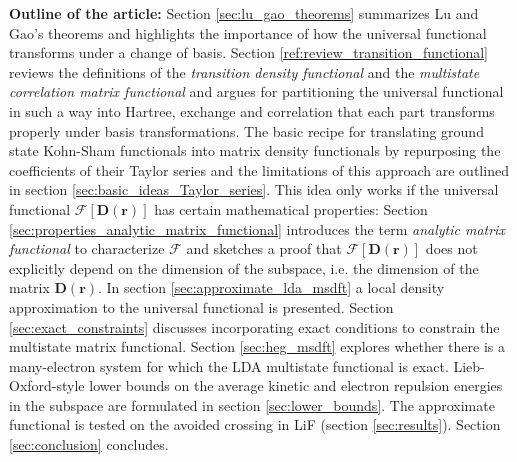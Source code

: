 \documentclass[journal=jpclcd,manuscript=letter]{achemso}
\newcommand\m[1]{\mathbf{#1}}
\renewcommand\vec[1]{\mathbf{#1}}
\begin{document}
\textbf{Outline of the article:} Section \ref{sec:lu_gao_theorems} summarizes Lu and Gao's theorems and highlights
the importance of how the universal functional transforms under a change of basis.
Section \ref{ref:review_transition_functional} reviews the definitions of the
\emph{transition density functional} and the \emph{multistate correlation matrix functional}
and argues for partitioning the universal functional in such a way into Hartree, exchange and correlation
that each part transforms properly under basis transformations.
The basic recipe for translating ground state Kohn-Sham functionals into matrix density functionals by repurposing
the coefficients of their Taylor series and the limitations of this approach are outlined in section \ref{sec:basic_ideas_Taylor_series}.
This idea only works if the universal functional $\m{\mathcal{F}}[\m{D}(\vec{r})]$ has certain mathematical properties: 
Section \ref{sec:properties_analytic_matrix_functional} introduces the term \emph{analytic matrix functional} to characterize $\m{\mathcal{F}}$
and sketches a proof that $\m{\mathcal{F}}[\m{D}(\vec{r})]$ does not explicitly depend on the dimension of the subspace,
i.e. the dimension of the matrix $\m{D}(\vec{r})$.
In section \ref{sec:approximate_lda_msdft} a local density approximation to the universal functional is presented.
Section \ref{sec:exact_constraints} discusses incorporating exact conditions to constrain the multistate matrix functional.
Section \ref{sec:heg_msdft} explores whether there is a many-electron system for which the LDA multistate functional is exact.
Lieb-Oxford-style lower bounds on the average kinetic and electron repulsion energies in the subspace
are formulated in section \ref{sec:lower_bounds}.
The approximate functional is tested on the avoided crossing in LiF (section \ref{sec:results}).
Section \ref{sec:conclusion} concludes.
\end{document}
